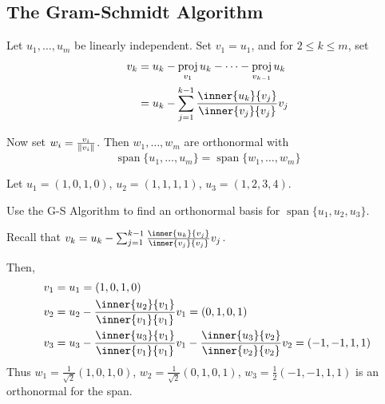 \documentclass{article}
\DeclareMathOperator{\spn}{span}
\DeclareMathOperator{\proj}{proj}
\begin{document}
    \subsection{The Gram-Schmidt Algorithm}
    \begin{theorem}
      Let $u_1, \ldots, u_m$ be linearly independent. Set $v_1 = u_1$, and for $2 \leq k \leq m$, set
      \begin{align*}
        v_k &= u_k - \proj_{v_1}u_k - \dots - \proj_{v_{k-1}}u_k\\
        &= u_k - \sum_{j=1}^{k-1} \frac{\inner{u_k}{v_j}}{\inner{v_j}{v_j}}v_j
      \end{align*}

      Now set $w_i = \frac{v_i}{\norm{v_i}}$. Then $w_1, \ldots, w_m$ are orthonormal with \[
        \spn \{u_1, \ldots, u_m\} = \spn\{w_1, \ldots, w_m\}
      \]
    \end{theorem}
    \begin{example}
      Let $u_1 = (1, 0, 1, 0)$, $u_2 = (1, 1, 1, 1)$, $u_3 = (1, 2, 3, 4)$.

      Use the G-S Algorithm to find an orthonormal basis for $\spn\{u_1, u_2, u_3\}$.

      Recall that $v_k = u_k - \sum_{j=1}^{k-1} \frac{\inner{u_k}{v_j}}{\inner{v_j}{v_j}}v_j$.

      Then,
      \begin{align*}
        v_1 &= u_1 = (1, 0, 1, 0)\\
        v_2 &= u_2 - \frac{\inner{u_2}{v_1}}{\inner{v_1}{v_1}}v_1 = (0, 1, 0, 1)\\
        v_3 &= u_3 - \frac{\inner{u_3}{v_1}}{\inner{v_1}{v_1}}v_1 - \frac{\inner{u_3}{v_2}}{\inner{v_2}{v_2}}v_2 = (-1, -1, 1, 1)\\
      \end{align*}
      Thus $w_1 = \frac{1}{\sqrt{2}}(1, 0, 1, 0)$, $w_2 = \frac{1}{\sqrt{2}}(0, 1, 0, 1)$, $w_3 = \frac{1}{2}(-1, -1, 1, 1)$ is an orthonormal for the span.
    \end{example}
\end{document}
